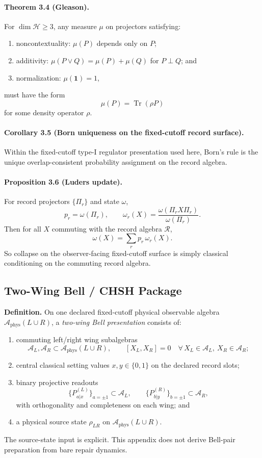 \paragraph{\textbf{Theorem 3.4 (Gleason).}}
For \(\dim \mathcal H\ge 3\), any measure \(\mu\) on projectors satisfying:
\begin{enumerate}[leftmargin=2em]
\item noncontextuality: \(\mu(P)\) depends only on \(P\);
\item additivity: \(\mu(P\vee Q)=\mu(P)+\mu(Q)\) for \(P\perp Q\); and
\item normalization: \(\mu(\mathbf 1)=1\),
\end{enumerate}
must have the form
\[
\mu(P)=\operatorname{Tr}(\rho P)
\]
for some density operator \(\rho\).

\paragraph{\textbf{Corollary 3.5 (Born uniqueness on the fixed-cutoff record surface).}}
Within the fixed-cutoff type-I regulator presentation used here, Born's rule is the unique
overlap-consistent probability assignment on the record algebra.

\paragraph{\textbf{Proposition 3.6 (Luders update).}}
For record projectors \(\{\Pi_r\}\) and state \(\omega\),
\[
p_r=\omega(\Pi_r),
\qquad
\omega_r(X)=\frac{\omega(\Pi_r X \Pi_r)}{\omega(\Pi_r)}.
\]
Then for all \(X\) commuting with the record algebra \(\mathcal R\),
\[
\omega(X)=\sum_r p_r\,\omega_r(X).
\]
So collapse on the observer-facing fixed-cutoff surface is simply classical conditioning on the
commuting record algebra.

\subsection{Two-Wing Bell / CHSH Package}

\textbf{Definition.} On one declared fixed-cutoff physical observable algebra
\(\mathcal A_{\mathrm{phys}}(L\cup R)\), a \emph{two-wing Bell presentation} consists of:
\begin{enumerate}[leftmargin=2em]
\item commuting left/right wing subalgebras
\[
\mathcal A_L,\mathcal A_R\subset \mathcal A_{\mathrm{phys}}(L\cup R),
\qquad
[X_L,X_R]=0
\quad
\forall\,X_L\in\mathcal A_L,\ X_R\in\mathcal A_R;
\]
\item central classical setting values \(x,y\in\{0,1\}\) on the declared record slots;
\item binary projective readouts
\[
\{P_{a|x}^{(L)}\}_{a=\pm1}\subset\mathcal A_L,
\qquad
\{P_{b|y}^{(R)}\}_{b=\pm1}\subset\mathcal A_R,
\]
with orthogonality and completeness on each wing; and
\item a physical source state \(\rho_{LR}\) on \(\mathcal A_{\mathrm{phys}}(L\cup R)\).
\end{enumerate}
The source-state input is explicit. This appendix does not derive Bell-pair preparation from
bare repair dynamics.

